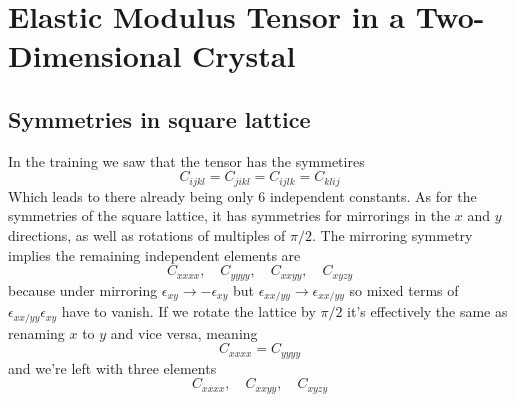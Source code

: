 \clearpage
\section{Elastic Modulus Tensor in a Two-Dimensional Crystal}
\subsection{Symmetries in square lattice}
In the training we saw that the tensor has the symmetires 
\begin{equation}
    C_{ijkl}=C_{jikl}=C_{ijlk}=C_{klij}
\end{equation}
Which leads to there already being only 6 independent constants. As for the symmetries of the square lattice, it has symmetries for mirrorings in the \(x\) and \(y\) directions, as well as rotations of multiples of \(\pi/2\). The mirroring symmetry implies the remaining independent elements are
\begin{equation}
C_{xxxx},\quad C_{yyyy},\quad C_{xxyy},\quad C_{xyzy}    
\end{equation}
because under mirroring \(\epsilon_{xy}\to-\epsilon_{xy}\) but \(\epsilon_{xx/yy}\to\epsilon_{xx/yy}\) so mixed terms of \(\epsilon_{xx/yy}\epsilon_{xy}\) have to vanish. If we rotate the lattice by \(\pi/2\) it's effectively the same as renaming \(x\) to \(y\) and vice versa, meaning 
\begin{equation}
    C_{xxxx}=C_{yyyy}
\end{equation}
and we're left with three elements
\begin{equation}
C_{xxxx},\quad C_{xxyy},\quad C_{xyzy}    
\end{equation}
